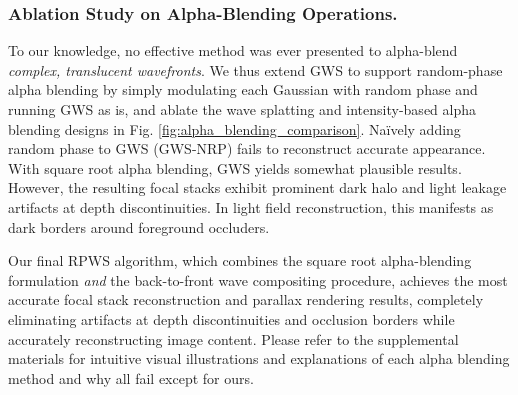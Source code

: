 \label{subsubsec:alpha_blending}
\subsubsection{Ablation Study on Alpha-Blending Operations. } To our knowledge, no effective method was ever presented to alpha-blend \textit{complex, translucent wavefronts}. We thus extend GWS \cite{choi2025gaussian} to support random-phase alpha blending by simply modulating each Gaussian with random phase and running GWS as is, and ablate the wave splatting and intensity-based alpha blending designs in Fig. \ref{fig:alpha_blending_comparison}. Na\"ively adding random phase to GWS (GWS-NRP) fails to reconstruct accurate appearance. With square root alpha blending, GWS yields somewhat plausible results. However, the resulting focal stacks exhibit prominent dark halo and light leakage artifacts at depth discontinuities. In light field reconstruction, this manifests as dark borders around foreground occluders.

Our final RPWS algorithm, which combines the square root alpha-blending formulation \textit{and} the back-to-front wave compositing procedure, achieves the most accurate focal stack reconstruction and parallax rendering results, completely eliminating artifacts at depth discontinuities and occlusion borders while accurately reconstructing image content. Please refer to the supplemental materials for intuitive visual illustrations and explanations of each alpha blending method and why all fail except for ours.

